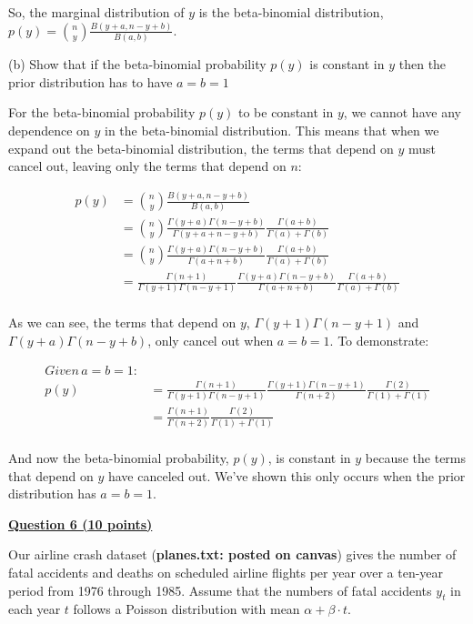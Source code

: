 \documentclass[12pt]{article}
\begin{document}
So, the marginal distribution of $y$ is the beta-binomial distribution, $p(y) = \binom{n}{y}\frac{B(y + a, n - y + b)}{B(a,b)}$.

(b) Show that if the beta-binomial probability $p(y)$ is constant in $y$ then the prior distribution has to have $a = b = 1$

For the beta-binomial probability $p(y)$ to be constant in $y$, we cannot have any dependence on $y$ in the beta-binomial distribution.
This means that when we expand out the beta-binomial distribution, the terms that depend on $y$ must cancel out, leaving only the terms that depend on $n$:

\begin{align*}
p(y) &= \binom{n}{y}\frac{B(y + a, n - y + b)}{B(a,b)} \\
&= \binom{n}{y}\frac{\Gamma(y + a)\Gamma(n - y + b)}{\Gamma(y + a + n - y + b)}\frac{\Gamma(a + b)}{\Gamma(a) + \Gamma(b)} \\
&= \binom{n}{y}\frac{\Gamma(y + a)\Gamma(n - y + b)}{\Gamma(a + n + b)}\frac{\Gamma(a + b)}{\Gamma(a) + \Gamma(b)} \\
&= \frac{\Gamma(n+1)}{\Gamma(y+1)\Gamma(n-y+1)}\frac{\Gamma(y + a)\Gamma(n - y + b)}{\Gamma(a + n + b)}\frac{\Gamma(a + b)}{\Gamma(a) + \Gamma(b)} \\
\end{align*}

As we can see, the terms that depend on $y$, $\Gamma(y+1)\Gamma(n-y+1)$ and $\Gamma(y + a)\Gamma(n - y + b)$, only cancel out
when $a = b = 1$. To demonstrate:

\begin{align*}
Given \, a = b = 1: \\
p(y) &= \frac{\Gamma(n+1)}{\Gamma(y+1)\Gamma(n-y+1)}\frac{\Gamma(y + 1)\Gamma(n - y + 1)}{\Gamma(n + 2)}\frac{\Gamma(2)}{\Gamma(1) + \Gamma(1)} \\
&= \frac{\Gamma(n+1)}{\Gamma(n+2)}\frac{\Gamma(2)}{\Gamma(1) + \Gamma(1)} \\
\end{align*}

And now the beta-binomial probability, $p(y)$, is constant in $y$ because the terms that depend on $y$ have
canceled out. We've shown this only occurs when the prior distribution has $a = b = 1$.

\bigskip


{\underline{\bf Question 6 (10 points)}}  

Our airline crash dataset ({\bf planes.txt: posted on canvas}) gives the number of fatal accidents and deaths on scheduled airline flights per year over a ten-year period from 1976 through 1985.  Assume that the numbers of fatal accidents $y_t$ in each year $t$ follows a Poisson distribution with mean $\alpha + \beta \cdot t$. 
\end{document}
